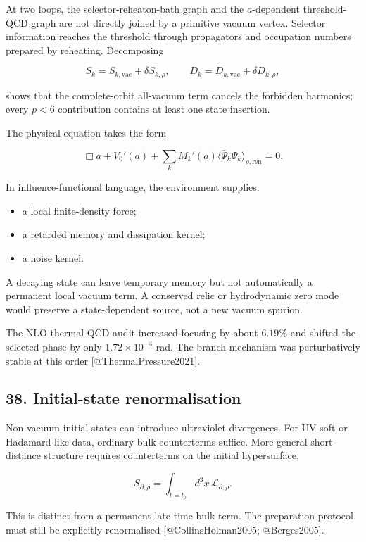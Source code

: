 \documentclass[
]{article}
\providecommand{\tightlist}{%
  \setlength{\itemsep}{0pt}\setlength{\parskip}{0pt}}
\begin{document}
At two loops, the selector-reheaton-bath graph and the \(a\)-dependent
threshold-QCD graph are not directly joined by a primitive vacuum
vertex. Selector information reaches the threshold through propagators
and occupation numbers prepared by reheating. Decomposing

\[
S_k=S_{k,\mathrm{vac}}+\delta S_{k,\rho},
\qquad
D_k=D_{k,\mathrm{vac}}+\delta D_{k,\rho},
\]

shows that the complete-orbit all-vacuum term cancels the forbidden
harmonics; every \(p<6\) contribution contains at least one state
insertion.

The physical equation takes the form

\[
\Box a+V_0'(a)
+\sum_kM_k'(a)\langle\bar\Psi_k\Psi_k\rangle_{\rho,\mathrm{ren}}=0.
\]

In influence-functional language, the environment supplies:

\begin{itemize}
\tightlist
\item
  a local finite-density force;
\item
  a retarded memory and dissipation kernel;
\item
  a noise kernel.
\end{itemize}

A decaying state can leave temporary memory but not automatically a
permanent local vacuum term. A conserved relic or hydrodynamic zero mode
would preserve a state-dependent source, not a new vacuum spurion.

The NLO thermal-QCD audit increased focusing by about \(6.19\%\) and
shifted the selected phase by only \(1.72\times10^{-4}\) rad. The branch
mechanism was perturbatively stable at this order
{[}@ThermalPressure2021{]}.

\hypertarget{initial-state-renormalisation}{%
\subsection{38. Initial-state
renormalisation}\label{initial-state-renormalisation}}

Non-vacuum initial states can introduce ultraviolet divergences. For
UV-soft or Hadamard-like data, ordinary bulk counterterms suffice. More
general short-distance structure requires counterterms on the initial
hypersurface,

\[
S_{\partial,\rho}
=\int_{t=t_0}d^3x\,\mathcal L_{\partial,\rho}.
\]

This is distinct from a permanent late-time bulk term. The preparation
protocol must still be explicitly renormalised {[}@CollinsHolman2005;
@Berges2005{]}.
\end{document}
